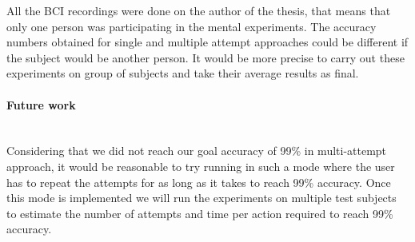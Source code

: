 \documentclass[12pt]{article}
\theoremstyle{definition}
\begin{document}
All the BCI recordings were done on the author of the thesis, that means that only one person was participating in the mental experiments. The accuracy numbers obtained for single and multiple attempt approaches could be different if the subject would be another person. It would be more precise to carry out these experiments on group of subjects and take their average results as final.

\paragraph{Future work}~\\

Considering that we did not reach our goal accuracy of 99\% in multi-attempt approach, it would be reasonable to try running in such a mode where the user has to repeat the attempts for as long as it takes to reach 99\% accuracy. Once this mode is implemented we will run the experiments on multiple test subjects to estimate the number of attempts and time per action required to reach 99\% accuracy.

\newpage




\newpage
\end{document}
